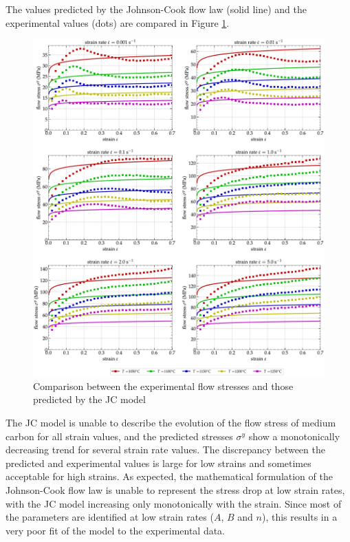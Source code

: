 \documentclass[metals,article,submit,pdftex,moreauthors]{Definitions/mdpi}
\begin{document}
The values predicted by the Johnson-Cook flow law (solid line) and the experimental values (dots) are compared in Figure \ref{fig:CompExp-JC-6}.
\begin{figure}[!ht]
\centering
\includegraphics[width=\columnwidth]{Figures/CompExp-JC-6}
\caption{Comparison between the experimental flow stresses and those predicted by the JC model}
\label{fig:CompExp-JC-6}
\end{figure}
The JC model is unable to describe the evolution of the flow stress of medium carbon for all strain values, and the predicted stresses $\sigma^y$ show a monotonically decreasing trend for several strain rate values.
The discrepancy between the predicted and experimental values is large for low strains and sometimes acceptable for high strains.
As expected, the mathematical formulation of the Johnson-Cook flow law is unable to represent the stress drop at low strain rates, with the JC model increasing only monotonically with the strain.
Since most of the parameters are identified at low strain rates ($A$, $B$ and $n$), this results in a very poor fit of the model to the experimental data.
\end{document}
